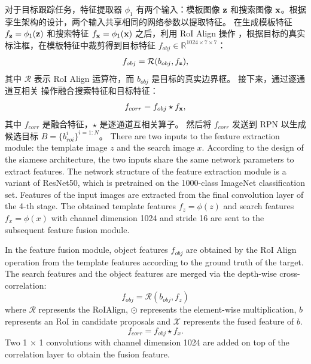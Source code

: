 对于目标跟踪任务，特征提取器 $\phi_{1}$ 有两个输入：模板图像 $\textbf z$ 和搜索图像 $\textbf x$。根据孪生架构的设计，两个输入共享相同的网络参数以提取特征。
在生成模板特征 $f_{\textbf z} = \phi_{1}(\textbf z)$ 和搜索特征 $f_{\textbf x} = \phi_{1}(\textbf x)$ 之后，利用 RoI Align 操作 \cite{he2017mask}，根据目标的真实标注框，在模板特征中裁剪得到目标特征 $f_{obj} \in \mathbb{R}^{1024 \times 7 \times 7}$：
\begin{equation}
    f_{obj} = \mathcal{R}(b_{obj}, f_{\textbf z}),
\end{equation}
其中 $\mathcal{R}$ 表示 RoI Align 运算符，而 $b_{obj}$ 是目标的真实边界框。
接下来，通过逐通道互相关 \cite{SiamRPN++} 操作融合搜索特征和目标特征：
\begin{equation}
    f_{corr} = f_{obj} \star f_{\textbf x},
\end{equation}
其中 $f_{corr}$ 是融合特征，$\star$ 是逐通道互相关算子。
然后将 $f_{corr}$ 发送到 RPN 以生成候选目标 $B=\{b^{i}_{roi}\}^{i=1:N}$。
\iffalse
There are two inputs to the feature extraction module: the template image $z$ and the search image $x$. According to the design of the siamese architecture, the two inputs share the same network parameters to extract features.
The network structure of the feature extraction module is a variant of ResNet50, which is pretrained on the 1000-class ImageNet classification set. Features of the input images are extracted from the final convolution layer of the 4-th stage. The obtained template features $f_{z} = \phi(z)$ and search features $f_{x} = \phi(x)$ with channel dimension 1024 and stride 16 are sent to the subsequent feature fusion module.

In the feature fusion module, object features $f_{obj}$ are obtained by the RoI Align operation from the template features according to the ground truth of the target. The search features and the object features are merged via the depth-wise cross-correlation:
\begin{equation}
    f_{obj} = \mathcal{R}(b_{obj}, f_{z})
\end{equation}
where $\mathcal{R}$ represents the RoIAlign, $\odot$ represents the element-wise multiplication, $b$ represents an RoI in candidate proposals and $\mathcal{X}$ represents the fused feature of $b$.
\begin{equation}
    f_{corr} = f_{obj} \star f_{x}.
\end{equation}
Two 1 $\times$ 1 convolutions with channel dimension 1024 are added on top of the correlation layer to obtain the fusion feature.

